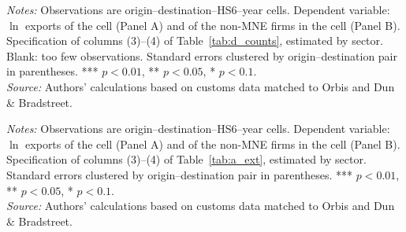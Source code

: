 \documentclass[11pt,a4paper]{article}
\begin{document}
\begin{table}[H]\centering\small%
  \caption{Multinational Presence and Exports by Sector: Intensive Margin}%
  \label{tab:a_f5sum}%
  \par\vspace{3pt}%
  \begin{minipage}{0.95\textwidth}\footnotesize %
  \textit{Notes:} Observations are origin--destination--HS6--year cells. Dependent variable: $\ln$ exports of the cell (Panel A) and of the non-MNE firms in the cell (Panel B). Specification of columns (3)--(4) of Table~\ref{tab:d_counts}, estimated by sector. Blank: too few observations. Standard errors clustered by origin--destination pair in parentheses. *** $p<0.01$, ** $p<0.05$, * $p<0.1$.\\[3pt]%
  \textit{Source:} Authors' calculations based on customs data matched to Orbis and Dun \& Bradstreet.%
  \end{minipage}%
  \end{table}
\begin{table}[H]\centering\small%
  \caption{Multinational Presence and Exports by Sector: Extensive Margin}%
  \label{tab:a_f5extsum}%
  \par\vspace{3pt}%
  \begin{minipage}{0.95\textwidth}\footnotesize %
  \textit{Notes:} Observations are origin--destination--HS6--year cells. Dependent variable: $\ln$ exports of the cell (Panel A) and of the non-MNE firms in the cell (Panel B). Specification of columns (3)--(4) of Table~\ref{tab:a_ext}, estimated by sector. Standard errors clustered by origin--destination pair in parentheses. *** $p<0.01$, ** $p<0.05$, * $p<0.1$.\\[3pt]%
  \textit{Source:} Authors' calculations based on customs data matched to Orbis and Dun \& Bradstreet.%
  \end{minipage}%
  \end{table}
\end{document}
